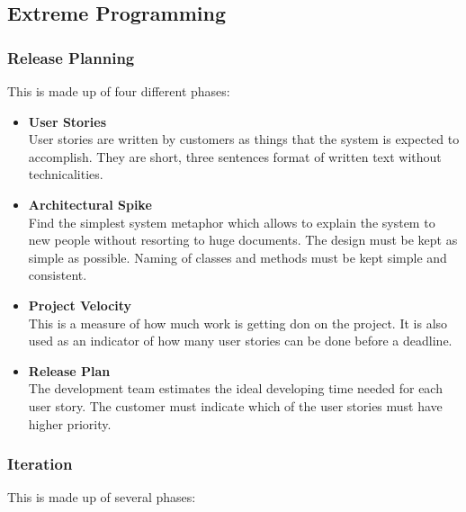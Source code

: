 \documentclass{article}
\begin{document}
\subsection{Extreme Programming}
\subsubsection{Release Planning}
This is made up of four different phases:

\begin{itemize}
	\item \textbf{User Stories}
	\vspace{.2cm} \\
	User stories are written by customers as things that the system is expected to accomplish. They are short, three sentences format of written text without technicalities.
	
	\item \textbf{Architectural Spike}
	\vspace{.2cm} \\
	Find the simplest system metaphor which allows to explain the system to new people without resorting to huge documents. The design must be kept as simple as possible. Naming of classes and methods must be kept simple and consistent.
	
	\item \textbf{Project Velocity}
	\vspace{.2cm} \\
	This is a measure of how much work is getting don on the project. It is also used as an indicator of how many user stories can be done before a deadline.
	
	\item \textbf{Release Plan}
	\vspace{.2cm} \\
	The development team estimates the ideal developing time needed for each user story. The customer must indicate which of the user stories must have higher priority.
\end{itemize}

\subsubsection{Iteration}
This is made up of several phases:
\end{document}
